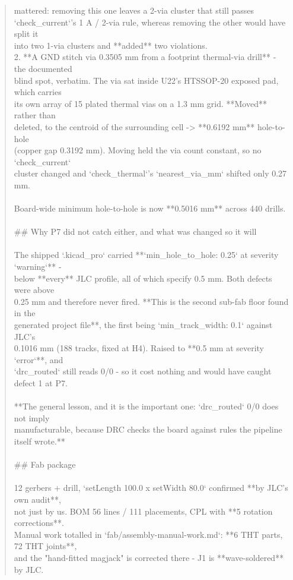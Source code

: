 \documentclass[11pt,a4paper]{article}
\begin{document}
\begin{quote}
   mattered: removing this one leaves a 2-via cluster that still passes\\
   `check\_current`'s 1 A / 2-via rule, whereas removing the other would have split it\\
   into two 1-via clusters and {*}{*}added{*}{*} two violations.\\
2. {*}{*}A GND stitch via 0.3505 mm from a footprint thermal-via drill{*}{*} - the documented\\
   blind spot, verbatim. The via sat inside U22's HTSSOP-20 exposed pad, which carries\\
   its own array of 15 plated thermal vias on a 1.3 mm grid. {*}{*}Moved{*}{*} rather than\\
   deleted, to the centroid of the surrounding cell -\textgreater{} {*}{*}0.6192 mm{*}{*} hole-to-hole\\
   (copper gap 0.3192 mm). Moving held the via count constant, so no `check\_current`\\
   cluster changed and `check\_thermal`'s `nearest\_via\_mm` shifted only 0.27 mm.\\
~\\
Board-wide minimum hole-to-hole is now {*}{*}0.5016 mm{*}{*} across 440 drills.\\
~\\
\#\# Why P7 did not catch either, and what was changed so it will\\
~\\
The shipped `.kicad\_pro` carried {*}{*}`min\_hole\_to\_hole: 0.25` at severity `warning`{*}{*} -\\
below {*}{*}every{*}{*} JLC profile, all of which specify 0.5 mm. Both defects were above\\
0.25 mm and therefore never fired. {*}{*}This is the second sub-fab floor found in the\\
generated project file{*}{*}, the first being `min\_track\_width: 0.1` against JLC's\\
0.1016 mm (188 tracks, fixed at H4). Raised to {*}{*}0.5 mm at severity `error`{*}{*}, and\\
`drc\_routed` still reads 0/0 - so it cost nothing and would have caught defect 1 at P7.\\
~\\
{*}{*}The general lesson, and it is the important one: `drc\_routed` 0/0 does not imply\\
manufacturable, because DRC checks the board against rules the pipeline itself wrote.{*}{*}\\
~\\
\#\# Fab package\\
~\\
12 gerbers + drill, `setLength 100.0 x setWidth 80.0` confirmed {*}{*}by JLC's own audit{*}{*},\\
not just by us. BOM 56 lines / 111 placements, CPL with {*}{*}5 rotation corrections{*}{*}.\\
Manual work totalled in `fab/assembly-manual-work.md`: {*}{*}6 THT parts, 72 THT joints{*}{*},\\
and the "hand-fitted magjack" is corrected there - J1 is {*}{*}wave-soldered{*}{*} by JLC.
\end{quote}
\end{document}
